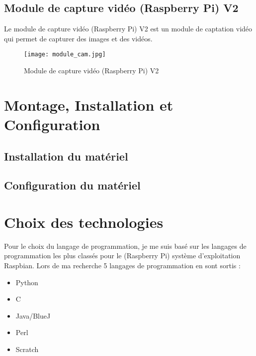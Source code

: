         \vspace{1cm}

        \subsection{Module de capture vidéo (Raspberry Pi) V2}
        Le module de capture vidéo (Raspberry Pi) V2 est un module de captation vidéo qui permet de capturer des images et des vidéos.
        \begin{figure}[h]
            \centering        
            \texttt{[image: module\_cam.jpg]}
            \caption{Module de capture vidéo (Raspberry Pi) V2}
        \end{figure}
        
    \section{Montage, Installation et Configuration}
        \subsection{Installation du matériel}  
        \subsection{Configuration du matériel}
    \section{Choix des technologies}
    Pour le choix du langage de programmation, je me suis basé sur les langages de programmation les plus classés pour le (Raspberry Pi) système d'exploitation Raspbian.
    Lors de ma recherche 5 langages de programmation en sont sortis : 

    \vspace{0.2cm}

    \begin{itemize}
        \item Python
        \item C
        \item Java/BlueJ
        \item Perl
        \item Scratch
    \end{itemize}

    \vspace{0.2cm}

